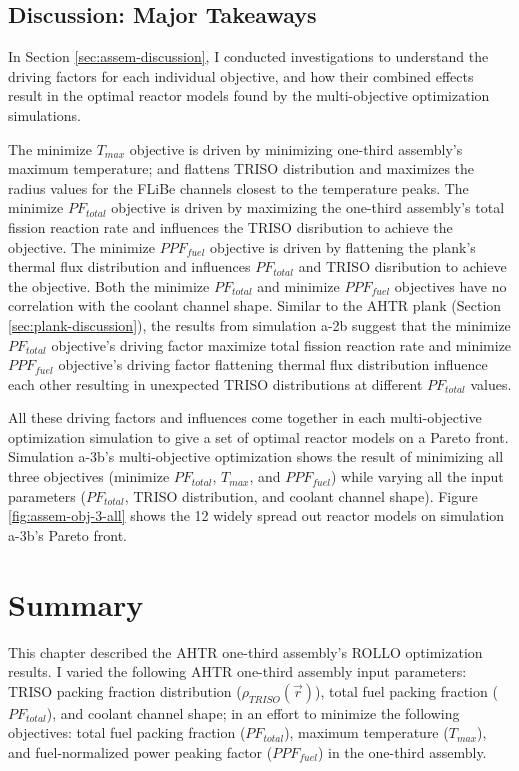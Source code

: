 \pagebreak
\subsection{Discussion: Major Takeaways}
In Section \ref{sec:assem-discussion}, I conducted investigations to understand the 
driving factors for each individual objective, and how their combined effects 
result in the optimal reactor models found by the multi-objective optimization 
simulations. 

The minimize $T_{max}$ objective is driven by minimizing one-third assembly's 
maximum temperature; and flattens TRISO distribution and maximizes the radius values 
for the FLiBe channels closest to the temperature peaks.
The minimize $PF_{total}$ objective is driven by maximizing the one-third assembly's 
total fission reaction rate and influences the TRISO disribution to achieve the objective. 
The minimize $PPF_{fuel}$ objective is driven by flattening the plank's thermal flux
distribution and influences $PF_{total}$ and TRISO disribution to achieve the objective. 
Both the minimize $PF_{total}$ and minimize $PPF_{fuel}$ objectives have no correlation 
with the coolant channel shape. 
Similar to the \gls{AHTR} plank (Section \ref{sec:plank-discussion}), the results 
from simulation a-2b suggest that the minimize $PF_{total}$ objective's driving factor 
maximize total fission reaction rate and minimize $PPF_{fuel}$ objective's driving factor 
flattening thermal flux distribution influence each other resulting in unexpected TRISO 
distributions at different $PF_{total}$ values. 

All these driving factors and influences come together in each multi-objective 
optimization simulation to give a set of optimal reactor models on a Pareto front. 
Simulation a-3b's multi-objective optimization shows the result of minimizing all 
three objectives (minimize $PF_{total}$, $T_{max}$, and $PPF_{fuel}$) while varying 
all the input parameters ($PF_{total}$, TRISO distribution, and coolant channel shape).
Figure \ref{fig:assem-obj-3-all} shows the 12 widely spread out reactor models on 
simulation a-3b's Pareto front. 

\section{Summary}
\glsresetall
This chapter described the \gls{AHTR} one-third assembly's \gls{ROLLO} optimization 
results. 
I varied the following \gls{AHTR} one-third assembly input parameters: \gls{TRISO} 
packing fraction distribution ($\rho_{TRISO}(\vec{r})$), total fuel packing fraction 
($PF_{total}$), and coolant channel shape; in an effort to minimize the following 
objectives: total fuel packing fraction ($PF_{total}$), maximum temperature 
($T_{max}$), and fuel-normalized power peaking factor ($PPF_{fuel}$) in the 
one-third assembly. 

